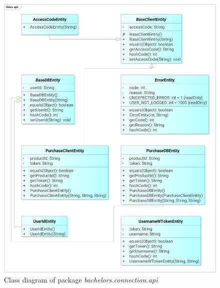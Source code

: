 \begin{figure}[h]	
	\includegraphics[width=\textwidth]{figures/classdiagrams/csapi}
	\centering			
	\caption{Class diagram of package \textit{bachelors.connection.api}}
\end{figure}

